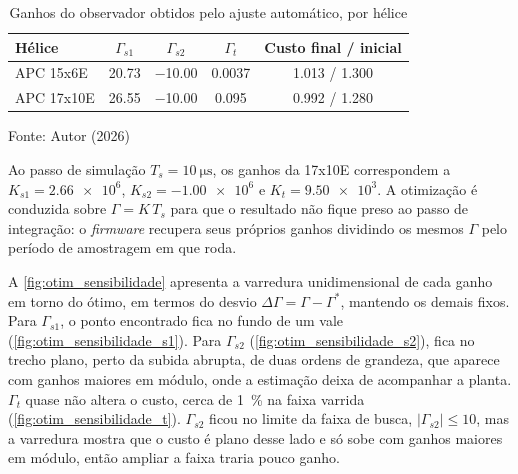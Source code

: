 \begin{table}[H]
    \centering
    \caption{Ganhos do observador obtidos pelo ajuste automático, por hélice}
    \label{tab:ganhos_helices}
    \begin{tabular}{lcccc}
        \toprule
        \textbf{Hélice} & $\Gamma_{s1}$ & $\Gamma_{s2}$ & $\Gamma_t$ & \textbf{Custo final / inicial} \\
        \midrule
        APC 15x6E  & \num{20,73} & \num{-10,00} & \num{0,0037} & \num{1,013} / \num{1,300} \\
        APC 17x10E & \num{26,55} & \num{-10,00} & \num{0,095}  & \num{0,992} / \num{1,280} \\
        \bottomrule
    \end{tabular}

    \vspace{2pt}
    {\small Fonte: Autor (2026)}
\end{table}

Ao passo de simulação $T_s=\SI{10}{\micro\second}$, os ganhos da 17x10E
correspondem a $K_{s1}=\num{2,66e6}$, $K_{s2}=\num{-1,00e6}$ e
$K_t=\num{9,50e3}$. A otimização é conduzida sobre
$\Gamma = K\,T_s$ para que o resultado não fique preso ao passo de
integração: o \textit{firmware} recupera seus próprios ganhos dividindo os
mesmos $\Gamma$ pelo período de amostragem em que roda.

A \autoref{fig:otim_sensibilidade} apresenta a varredura unidimensional de
cada ganho em torno do ótimo, em termos do desvio $\Delta\Gamma = \Gamma -
\Gamma^*$, mantendo os demais fixos. Para $\Gamma_{s1}$, o ponto encontrado
fica no fundo de um vale (\autoref{fig:otim_sensibilidade_s1}). Para
$\Gamma_{s2}$ (\autoref{fig:otim_sensibilidade_s2}), fica no trecho
plano, perto da subida abrupta, de duas ordens de grandeza, que aparece com
ganhos maiores em módulo, onde a estimação deixa de acompanhar a planta.
$\Gamma_t$ quase não altera o custo, cerca de \SI{1}{\percent} na faixa
varrida (\autoref{fig:otim_sensibilidade_t}). $\Gamma_{s2}$ ficou no limite da faixa de busca, $|\Gamma_{s2}| \le 10$,
mas a varredura mostra que o custo é plano desse lado e só sobe com ganhos
maiores em módulo, então ampliar a faixa traria pouco ganho.

